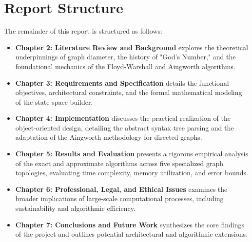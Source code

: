 \section{Report Structure}
The remainder of this report is structured as follows:
\begin{itemize}
    \item \textbf{Chapter 2: Literature Review and Background} explores the theoretical underpinnings of graph diameter, the history of "God's Number," and the foundational mechanics of the Floyd-Warshall and Aingworth algorithms.
    \item \textbf{Chapter 3: Requirements and Specification} details the functional objectives, architectural constraints, and the formal mathematical modeling of the state-space builder.
    \item \textbf{Chapter 4: Implementation} discusses the practical realization of the object-oriented design, detailing the abstract syntax tree parsing and the adaptation of the Aingworth methodology for directed graphs.
    \item \textbf{Chapter 5: Results and Evaluation} presents a rigorous empirical analysis of the exact and approximate algorithms across five specialized graph topologies, evaluating time complexity, memory utilization, and error bounds.
    \item \textbf{Chapter 6: Professional, Legal, and Ethical Issues} examines the broader implications of large-scale computational processes, including sustainability and algorithmic efficiency.
    \item \textbf{Chapter 7: Conclusions and Future Work} synthesizes the core findings of the project and outlines potential architectural and algorithmic extensions.
\end{itemize}
